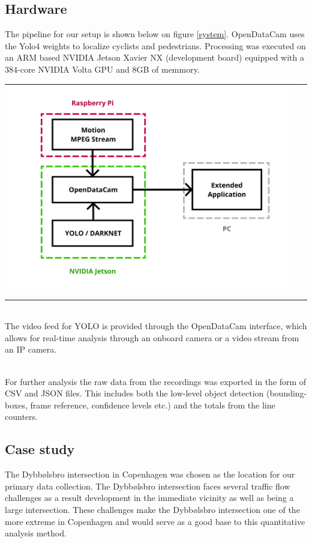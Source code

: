 \documentclass[
10pt, %
a4paper, %
oneside, %
headinclude,footinclude, %
] {book}%
\begin{document}
\subsection{Hardware}
The pipeline for our setup is shown below on figure \ref{system}. OpenDataCam uses the Yolo4 weights to localize cyclists and pedestrians.
Processing was executed on an ARM based NVIDIA Jetson Xavier NX (development board) equipped with a 384-core NVIDIA Volta GPU
and 8GB of memmory. 

\raggedbottom
\noindent
\begin{tabular}{@{}cc}
\includegraphics[width=1.0\columnwidth]{system} 
\end{tabular}
\label{system}

\ \\
The video feed for YOLO is provided through the OpenDataCam interface, which allows for real-time analysis through an onboard camera
or a video stream from an IP camera. 

\ \\
For further analysis the raw data from the recordings was exported in the form of CSV and JSON files. This includes both the low-level
object detection (bounding-boxes, frame reference, confidence levels etc.) and the totals from the line counters.

\subsection{Case study}
The Dybbølsbro intersection in Copenhagen was chosen as the location for our primary data collection. 
The Dybbølsbro intersection faces several traffic flow challenges as a result development in the immediate vicinity as well as being a large intersection.
These challenges make the Dybbølsbro intersection one of the more extreme in Copenhagen and would serve as a good base to this quantitative analysis method. 
\end{document}
